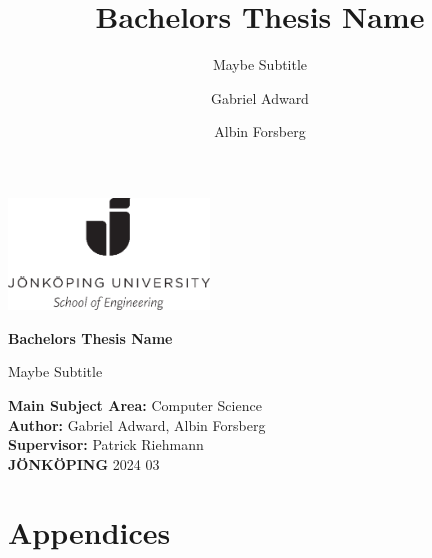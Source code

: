 \documentclass[11pt]{scrreprt}
\title{Bachelors Thesis Name}
\subtitle{Maybe Subtitle}
\author{Gabriel Adward \and Albin Forsberg}
\begin{document}
\begin{titlepage}
        \includegraphics[width=0.4\textwidth]{./Images/ju.png}
        \vspace{2cm}
        
        \fontsize{40}{40}\selectfont
        \textbf{Bachelors Thesis Name}
        
        \vspace{0.5cm}
        \LARGE
        Maybe Subtitle
        
        \vfill
        \small
        \noindent
        \textbf{Main Subject Area:} Computer Science \\
        \textbf{Author:} Gabriel Adward, Albin Forsberg \\
        \textbf{Supervisor:} Patrick Riehmann \\
        \textbf{JÖNKÖPING} 2024 03
\end{titlepage}


\begin{abstract}
    
\end{abstract}

\tableofcontents










\cite{greenwade93}



\chapter{Appendices}
\appendix

\end{document}
